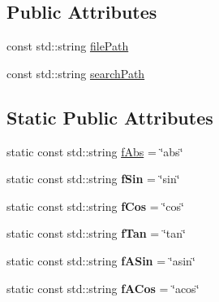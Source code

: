 \subsection*{Public Attributes}
\begin{DoxyCompactItemize}
\item 
const std\-::string \hyperlink{classgiskard__suturo_1_1AdvancedScope_a2b3e583a28325902fec73e0063646cab}{file\-Path}
\item 
const std\-::string \hyperlink{classgiskard__suturo_1_1AdvancedScope_a10d0cc3f9602ef2bca32dd44bc49e30e}{search\-Path}
\end{DoxyCompactItemize}
\subsection*{Static Public Attributes}
\begin{DoxyCompactItemize}
\item 
static const std\-::string \hyperlink{classgiskard__suturo_1_1AdvancedScope_a2cc175184a5c1f1e9ca8265cfb5463bc}{f\-Abs} = \char`\"{}abs\char`\"{}
\item 
\hypertarget{classgiskard__suturo_1_1AdvancedScope_a229cb23a623f37c4f3533efb0a7c26c5}{static const std\-::string {\bfseries f\-Sin} = \char`\"{}sin\char`\"{}}\label{classgiskard__suturo_1_1AdvancedScope_a229cb23a623f37c4f3533efb0a7c26c5}

\item 
\hypertarget{classgiskard__suturo_1_1AdvancedScope_ac8939a6445302c56481d5e5ab2aa2260}{static const std\-::string {\bfseries f\-Cos} = \char`\"{}cos\char`\"{}}\label{classgiskard__suturo_1_1AdvancedScope_ac8939a6445302c56481d5e5ab2aa2260}

\item 
\hypertarget{classgiskard__suturo_1_1AdvancedScope_a8e90b6ecdf4391956ce88b0328fe2d66}{static const std\-::string {\bfseries f\-Tan} = \char`\"{}tan\char`\"{}}\label{classgiskard__suturo_1_1AdvancedScope_a8e90b6ecdf4391956ce88b0328fe2d66}

\item 
\hypertarget{classgiskard__suturo_1_1AdvancedScope_a925b5ff49be8abcea970900841796087}{static const std\-::string {\bfseries f\-A\-Sin} = \char`\"{}asin\char`\"{}}\label{classgiskard__suturo_1_1AdvancedScope_a925b5ff49be8abcea970900841796087}

\item 
\hypertarget{classgiskard__suturo_1_1AdvancedScope_a55ae314601243ceca32285fc17d06943}{static const std\-::string {\bfseries f\-A\-Cos} = \char`\"{}acos\char`\"{}}\label{classgiskard__suturo_1_1AdvancedScope_a55ae314601243ceca32285fc17d06943}


\end{DoxyCompactItemize}
